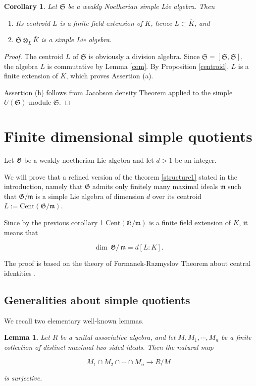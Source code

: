 \documentclass[11pt, letterpaper, reqno]{amsart}
\newtheorem{cor}[theorem]{Corollary}
\newtheorem{lemma}[theorem]{Lemma}
\theoremstyle{definition}
\newcommand{\fm}{\mathfrak{m}}
\newcommand{\fG}{\mathfrak{G}}
\newcommand{\fS}{\mathfrak{S}}
\newcommand{\Cent}{\mathrm{Cent}}
\begin{document}
\begin{cor}\label{simplecentroid} Let $\fS$ be a weakly Noetherian simple 
Lie algebra. Then
\begin{enumerate}
\item[(a)] Its centroid $L$ is a finite field extension of $K$, hence $L\subset\overline{K}$, and
\item[(b)] $\fS\otimes_L\overline{K}$ is a simple
Lie algebra.
\end{enumerate}
\end{cor}

\begin{proof} The centroid $L$ of $\fS$ is obviously a division algebra. Since $\fS=[\fS,\fS]$, the algebra $L$ is commutative by Lemma \ref{com}. 
By Proposition \ref{centroid}, $L$ is a finite extension of $K$, which proves Assertion (a).

Assertion (b) follows from Jacobson density Theorem \cite{Jac} applied to the simple $U(\fS)$-module $\fS$.

\end{proof}

\section{Finite dimensional simple quotients}\label{Ass(c)}

Let $\fG$ be a weakly noetherian Lie algebra
and let $d>1$ be an integer. 

  We will prove that a refined version of the 
theorem \ref{structure1} stated in the introduction, namely 
that $\fG$ admits only finitely many maximal ideals 
$\fm$ such that $\fG/\fm$ is a simple Lie algebra
of dimension $d$ over its centroid 
$L:=\Cent(\fG/\fm)$. 

Since by  the previous corollary \ref{simplecentroid}
$\Cent(\fG/\fm)$ is a finite field extension 
of $K$, it means  that

$$\dim\,\fG/ \,\fm= d [L:K].$$

The proof is based on the theory of 
Formanek-Razmyslov Theorem about central identities
\cite{Formanek, Razmyslov}. 


\subsection{Generalities about simple quotients}

We recall two elementary  well-known lemmas.

\begin{lemma}\label{dense} Let $R$ be a unital associative
algebra, and let $M, M_1,\cdots, M_n$ be a finite
collection of distinct maximal two-sided ideals.
Then the natural map

 $$M_1\cap M_2\cap\cdots\cap M_n\to  R/M$$
 
\noindent is surjective.
\end{lemma} 
\end{document}
